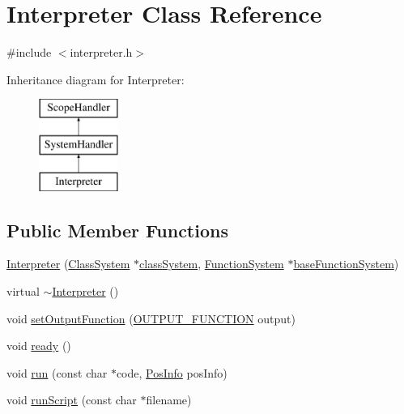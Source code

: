 \hypertarget{classInterpreter}{}\section{Interpreter Class Reference}
\label{classInterpreter}


{\ttfamily \#include $<$interpreter.\+h$>$}

Inheritance diagram for Interpreter\+:\begin{figure}[H]
\begin{center}
\leavevmode
\includegraphics[height=3.000000cm]{classInterpreter}
\end{center}
\end{figure}
\subsection*{Public Member Functions}
\begin{DoxyCompactItemize}
\item 
\hyperlink{classInterpreter_af4a885b059b6af440882047e8406bc9c}{Interpreter} (\hyperlink{classClassSystem}{Class\+System} $\ast$\hyperlink{classSystemHandler_ace6de39b5621a138654577c93f3ce9aa}{class\+System}, \hyperlink{classFunctionSystem}{Function\+System} $\ast$\hyperlink{classSystemHandler_af601707ec9f56e24be4c0541a1c760f4}{base\+Function\+System})
\item 
virtual \hyperlink{classInterpreter_a462a2467300903e0188ac6e4a6a612f6}{$\sim$\+Interpreter} ()
\item 
void \hyperlink{classInterpreter_a3578606fb7dfe1705aee148a468a39a6}{set\+Output\+Function} (\hyperlink{interpreter_8h_a57e80eaa218fd4f66b1d55c833119967}{O\+U\+T\+P\+U\+T\+\_\+\+F\+U\+N\+C\+T\+I\+ON} output)
\item 
void \hyperlink{classInterpreter_ab51bbc767ecf73aca9137b1a78406e20}{ready} ()
\item 
void \hyperlink{classInterpreter_acd0f2550080bcf9c769da5e9b056d005}{run} (const char $\ast$code, \hyperlink{classPosInfo}{Pos\+Info} pos\+Info)
\item 
void \hyperlink{classInterpreter_a98b6ecfea24f94e180bd1853a39f0a12}{run\+Script} (const char $\ast$filename)
\end{DoxyCompactItemize}
